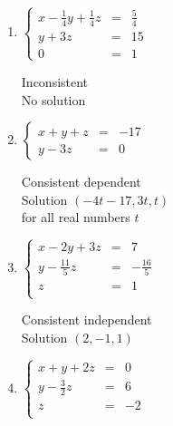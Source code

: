 \documentclass{ximera}
\begin{document}
\begin{enumerate}

\item $\left\{ \begin{array}{rcr} x - \frac{1}{4}y + \frac{1}{4}z & = & \frac{5}{4} \\ [3pt] y + 3z & = & 15 \\ 0 & = & 1 \end{array} \right.$

Inconsistent\\
No solution



\item $\left\{ \begin{array}{rcr} x + y + z & = & -17  \\ y - 3z & = & 0  \end{array} \right.$
 

Consistent dependent\\
Solution $(-4t - 17, 3t, t)$\\
for all real numbers $t$


\item $\left\{ \begin{array}{rcr} x-2y+3z & = & 7  \\ y - \frac{11}{5}z & = & -\frac{16}{5} \\ z & = & 1 \\  \end{array} \right.$
 

Consistent independent\\
Solution $(2,-1,1)$


\item $\left\{ \begin{array}{rcr} x+y+2z & = & 0  \\ y - \frac{3}{2}z & = & 6 \\ z & = & -2 \\  \end{array} \right.$
 


\end{enumerate}
\end{document}

